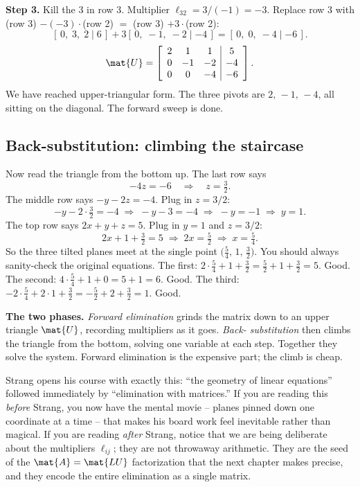 \textbf{Step 3.} Kill the $3$ in row 3. Multiplier $\ell_{32} = 3/(-1) = -3$.
Replace row 3 with (row 3) $-(-3)\cdot$(row 2) $=$ (row 3) $+ 3\cdot$(row 2):
\[
[\,0,\;3,\;2\mid 6\,] + 3[\,0,\;-1,\;-2\mid -4\,] = [\,0,\;0,\;-4\mid -6\,].
\]
\[
\mat{U}=\left[\begin{array}{ccc|c}
2 & 1 & 1 & 5\\
0 & -1 & -2 & -4\\
0 & 0 & -4 & -6
\end{array}\right].
\]
We have reached upper-triangular form. The three pivots are $2,\,-1,\,-4$, all
sitting on the diagonal. The forward sweep is done.

\subsection{Back-substitution: climbing the staircase}

Now read the triangle from the bottom up. The last row says
\[
-4z = -6 \quad\Longrightarrow\quad z = \tfrac{3}{2}.
\]
The middle row says $-y - 2z = -4$. Plug in $z = 3/2$:
\[
-y - 2\cdot\tfrac{3}{2} = -4 \;\Longrightarrow\; -y - 3 = -4 \;\Longrightarrow\;
-y = -1 \;\Longrightarrow\; y = 1.
\]
The top row says $2x + y + z = 5$. Plug in $y = 1$ and $z = 3/2$:
\[
2x + 1 + \tfrac{3}{2} = 5 \;\Longrightarrow\; 2x = \tfrac{5}{2}
\;\Longrightarrow\; x = \tfrac{5}{4}.
\]
So the three tilted planes meet at the single point
$\bigl(\tfrac54,\,1,\,\tfrac32\bigr)$. You should always sanity-check the
original equations. The first: $2\cdot\frac54 + 1 + \frac32 = \frac52 + 1 +
\frac32 = 5$. Good. The second: $4\cdot\frac54 + 1 + 0 = 5 + 1 = 6$. Good. The
third: $-2\cdot\frac54 + 2\cdot 1 + \frac32 = -\frac52 + 2 + \frac32 = 1$. Good.

\begin{focusbox}
\textbf{The two phases.} \emph{Forward elimination} grinds the matrix down to an
upper triangle $\mat{U}$, recording multipliers as it goes. \emph{Back-
substitution} then climbs the triangle from the bottom, solving one variable at
each step. Together they solve the system. Forward elimination is the expensive
part; the climb is cheap.
\end{focusbox}

\begin{strangbox}
Strang opens his course with exactly this: ``the geometry of linear equations''
followed immediately by ``elimination with matrices.'' If you are reading this
\emph{before} Strang, you now have the mental movie -- planes pinned down one
coordinate at a time -- that makes his board work feel inevitable rather than
magical. If you are reading \emph{after} Strang, notice that we are being
deliberate about the multipliers $\ell_{ij}$; they are not throwaway arithmetic.
They are the seed of the $\mat{A}=\mat{LU}$ factorization that the next chapter
makes precise, and they encode the entire elimination as a single matrix.
\end{strangbox}

